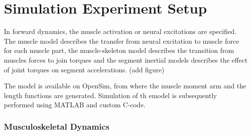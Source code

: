 \chapter{Simulation Experiment Setup}



In forward dynamics, the muscle activation or neural excitations are specified. 
The muscle model describes the transfer from neural excitation to muscle force for each muscle part, the muscle-skeleton model describes the transition from muscles forces to join torques and the segment inertial models describes the effect of joint torques on segment accelerations. (add figure) \cite{RTS}


The model is available on OpenSim, from where the muscle moment arm and the length functions are generated. Simulation of th emodel is subsequently performed using MATLAB and custom C-code. 

\subsection{ Musculoskeletal Dynamics}

